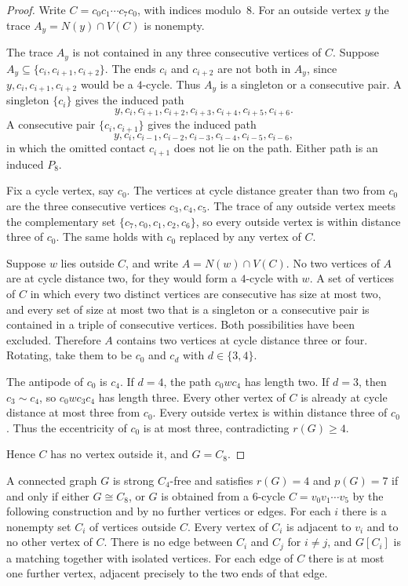\documentclass[ASNA]{USG}
\theoremstyle{WBstyletwo}
\numberwithin{equation}{section}
\newcommand{\pp}{p}
\begin{document}
\begin{proof}
Write $C=c_0c_1\cdots c_7c_0$, with indices modulo~$8$. For an outside vertex $y$ the trace $A_y=N(y)\cap V(C)$ is nonempty.

The trace $A_y$ is not contained in any three consecutive vertices of $C$. Suppose $A_y\subseteq\{c_i,c_{i+1},c_{i+2}\}$. The ends $c_i$ and $c_{i+2}$ are not both in $A_y$, since $y,c_i,c_{i+1},c_{i+2}$ would be a $4$-cycle. Thus $A_y$ is a singleton or a consecutive pair. A singleton $\{c_i\}$ gives the induced path
\[
y,c_i,c_{i+1},c_{i+2},c_{i+3},c_{i+4},c_{i+5},c_{i+6}.
\]
A consecutive pair $\{c_i,c_{i+1}\}$ gives the induced path
\[
y,c_i,c_{i-1},c_{i-2},c_{i-3},c_{i-4},c_{i-5},c_{i-6},
\]
in which the omitted contact $c_{i+1}$ does not lie on the path. Either path is an induced $P_8$.

Fix a cycle vertex, say $c_0$. The vertices at cycle distance greater than two from $c_0$ are the three consecutive vertices $c_3,c_4,c_5$. The trace of any outside vertex meets the complementary set $\{c_7,c_0,c_1,c_2,c_6\}$, so every outside vertex is within distance three of $c_0$. The same holds with $c_0$ replaced by any vertex of $C$.

Suppose $w$ lies outside $C$, and write $A=N(w)\cap V(C)$. No two vertices of $A$ are at cycle distance two, for they would form a $4$-cycle with $w$. A set of vertices of $C$ in which every two distinct vertices are consecutive has size at most two, and every set of size at most two that is a singleton or a consecutive pair is contained in a triple of consecutive vertices. Both possibilities have been excluded. Therefore $A$ contains two vertices at cycle distance three or four. Rotating, take them to be $c_0$ and $c_d$ with $d\in\{3,4\}$.

The antipode of $c_0$ is $c_4$. If $d=4$, the path $c_0wc_4$ has length two. If $d=3$, then $c_3\sim c_4$, so $c_0wc_3c_4$ has length three. Every other vertex of $C$ is already at cycle distance at most three from $c_0$. Every outside vertex is within distance three of $c_0$. Thus the eccentricity of $c_0$ is at most three, contradicting $r(G)\ge 4$.

Hence $C$ has no vertex outside it, and $G=C_8$.
\end{proof}

\begin{theorem}\label{thm:r4}
A connected graph $G$ is strong $C_4$-free and satisfies $r(G)=4$ and $\pp(G)=7$ if and only if either $G\cong C_8$, or $G$ is obtained from a $6$-cycle $C=v_0v_1\cdots v_5$ by the following construction and by no further vertices or edges. For each $i$ there is a nonempty set $C_i$ of vertices outside $C$. Every vertex of $C_i$ is adjacent to $v_i$ and to no other vertex of $C$. There is no edge between $C_i$ and $C_j$ for $i\ne j$, and $G[C_i]$ is a matching together with isolated vertices. For each edge of $C$ there is at most one further vertex, adjacent precisely to the two ends of that edge.
\end{theorem}
\end{document}
